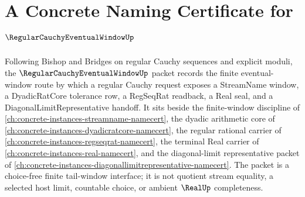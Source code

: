 \chapter{A Concrete Naming Certificate for $\RegularCauchyEventualWindowUp$}
\label{ch:concrete-instances-regular-cauchy-eventual-window-namecert}

Following Bishop and Bridges on regular Cauchy sequences and explicit moduli, the $\RegularCauchyEventualWindowUp$ packet records the finite eventual-window route by which a regular Cauchy request exposes a StreamName window, a DyadicRatCore tolerance row, a RegSeqRat readback, a Real seal, and a DiagonalLimitRepresentative handoff. It sits beside the finite-window discipline of \autoref{ch:concrete-instances-streamname-namecert}, the dyadic arithmetic core of \autoref{ch:concrete-instances-dyadicratcore-namecert}, the regular rational carrier of \autoref{ch:concrete-instances-regseqrat-namecert}, the terminal Real carrier of \autoref{ch:concrete-instances-real-namecert}, and the diagonal-limit representative packet of \autoref{ch:concrete-instances-diagonallimitrepresentative-namecert}. The packet is a choice-free finite tail-window interface; it is not quotient stream equality, a selected host limit, countable choice, or ambient $\RealUp$ completeness.

